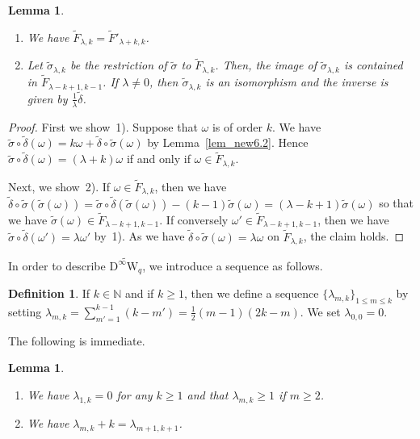 \documentclass[12pt]{amsart}
\newcommand{\N}{{\mathbb N}}
\newcommand{\W}{\mathrm{W}}
\newcommand{\D}{\mathrm{D}}
\newtheorem{lemma}[theorem]{Lemma}
\theoremstyle{definition}
\newtheorem{definition}[theorem]{Definition}
\theoremstyle{remark}
\begin{document}
\begin{lemma}
\label{eigenspaces}
\begin{enumerate}[label=\textup{\arabic*)}]
\item
We have $\widetilde{F}_{\lambda,k}=\widetilde{F}'_{\lambda+k,k}$.
\item
Let $\widetilde\sigma_{\lambda,k}$ be the restriction of $\widetilde\sigma$ to $\widetilde{F}_{\lambda,k}$.
Then, the image of $\widetilde\sigma_{\lambda,k}$ is contained in $\widetilde{F}_{\lambda-k+1,k-1}$.
If $\lambda\neq0$, then $\widetilde\sigma_{\lambda,k}$ is an isomorphism and the inverse is given by $\frac1{\lambda}\widetilde\delta$.
\end{enumerate}
\end{lemma}
\begin{proof}
First we show~1).
Suppose that $\omega$ is of order $k$.
We have $\widetilde\sigma\circ\widetilde\delta(\omega)=k\omega+\widetilde\delta\circ\widetilde\sigma(\omega)$ by Lemma~\ref{lem_new6.2}.
Hence $\widetilde\sigma\circ\widetilde\delta(\omega)=(\lambda+k)\omega$ if and only if $\omega\in\widetilde{F}_{\lambda,k}$.

Next, we show~2).
If $\omega\in\widetilde{F}_{\lambda,k}$, then we have $\widetilde\delta\circ\widetilde\sigma(\widetilde\sigma(\omega))=\widetilde\sigma\circ\widetilde\delta(\widetilde\sigma(\omega))-\mbox{$(k-1)$}\widetilde\sigma(\omega)=(\lambda-k+1)\widetilde\sigma(\omega)$ so that we have $\widetilde\sigma(\omega)\in\widetilde{F}_{\lambda-k+1,k-1}$.
If conversely $\omega'\in\widetilde{F}_{\lambda-k+1,k-1}$, then we have $\widetilde\sigma\circ\widetilde\delta(\omega')=\lambda\omega'$ by~1).
As we have $\widetilde\delta\circ\widetilde\sigma(\omega)=\lambda\omega$ on $\widetilde{F}_{\lambda,k}$, the claim holds.
\end{proof}

In order to describe $\widetilde{\D^\infty\W_q}$, we introduce a sequence as follows.
\begin{definition}
\label{def9.3}
If $k\in\N$ and if $k\geq1$, then we define a sequence $\{\lambda_{m,k}\}_{1\leq m\leq k}$ by setting $\lambda_{m,k}=\sum_{m'=1}^{k-1}(k-m')=\frac12(m-1)(2k-m)$.
We set $\lambda_{0,0}=0$.
\end{definition}

The following is immediate.
\begin{lemma}
\begin{enumerate}
\item[\textup{1)}]
We have $\lambda_{1,k}=0$ for any $k\geq1$ and that $\lambda_{m,k}\geq1$ if $m\geq2$.
\item[\textup{2)}]
We have $\lambda_{m,k}+k=\lambda_{m+1,k+1}$.
\end{enumerate}
\end{lemma}
\end{document}
